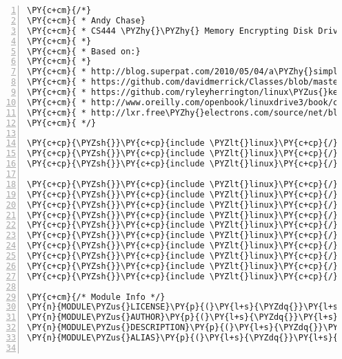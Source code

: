 \begin{Verbatim}[commandchars=\\\{\},numbers=left,firstnumber=1,stepnumber=1]
\PY{c+cm}{/*}
\PY{c+cm}{ * Andy Chase}
\PY{c+cm}{ * CS444 \PYZhy{}\PYZhy{} Memory Encrypting Disk Driver}
\PY{c+cm}{ *}
\PY{c+cm}{ * Based on:}
\PY{c+cm}{ *}
\PY{c+cm}{ * http://blog.superpat.com/2010/05/04/a\PYZhy{}simple\PYZhy{}block\PYZhy{}driver\PYZhy{}for\PYZhy{}linux\PYZhy{}kernel\PYZhy{}2\PYZhy{}6\PYZhy{}31/}
\PY{c+cm}{ * https://github.com/davidmerrick/Classes/blob/master/CS411/project3/osurd.c}
\PY{c+cm}{ * https://github.com/ryleyherrington/linux\PYZus{}kernel\PYZus{}411/blob/master/device\PYZus{}driver/device\PYZus{}driver.c}
\PY{c+cm}{ * http://www.oreilly.com/openbook/linuxdrive3/book/ch16.pdf}
\PY{c+cm}{ * http://lxr.free\PYZhy{}electrons.com/source/net/bluetooth/smp.c?v=3.14\PYZsh{}L54}
\PY{c+cm}{ */}

\PY{c+cp}{\PYZsh{}}\PY{c+cp}{include \PYZlt{}linux}\PY{c+cp}{/}\PY{c+cp}{module.h\PYZgt{}}
\PY{c+cp}{\PYZsh{}}\PY{c+cp}{include \PYZlt{}linux}\PY{c+cp}{/}\PY{c+cp}{moduleparam.h\PYZgt{}}
\PY{c+cp}{\PYZsh{}}\PY{c+cp}{include \PYZlt{}linux}\PY{c+cp}{/}\PY{c+cp}{init.h\PYZgt{}}

\PY{c+cp}{\PYZsh{}}\PY{c+cp}{include \PYZlt{}linux}\PY{c+cp}{/}\PY{c+cp}{kernel.h\PYZgt{}	}\PY{c+cm}{/* printk() */}
\PY{c+cp}{\PYZsh{}}\PY{c+cp}{include \PYZlt{}linux}\PY{c+cp}{/}\PY{c+cp}{fs.h\PYZgt{}		}\PY{c+cm}{/* everything... */}
\PY{c+cp}{\PYZsh{}}\PY{c+cp}{include \PYZlt{}linux}\PY{c+cp}{/}\PY{c+cp}{errno.h\PYZgt{}	}\PY{c+cm}{/* error codes */}
\PY{c+cp}{\PYZsh{}}\PY{c+cp}{include \PYZlt{}linux}\PY{c+cp}{/}\PY{c+cp}{types.h\PYZgt{}	}\PY{c+cm}{/* size\PYZus{}t */}
\PY{c+cp}{\PYZsh{}}\PY{c+cp}{include \PYZlt{}linux}\PY{c+cp}{/}\PY{c+cp}{vmalloc.h\PYZgt{}}
\PY{c+cp}{\PYZsh{}}\PY{c+cp}{include \PYZlt{}linux}\PY{c+cp}{/}\PY{c+cp}{genhd.h\PYZgt{}}
\PY{c+cp}{\PYZsh{}}\PY{c+cp}{include \PYZlt{}linux}\PY{c+cp}{/}\PY{c+cp}{blkdev.h\PYZgt{}}
\PY{c+cp}{\PYZsh{}}\PY{c+cp}{include \PYZlt{}linux}\PY{c+cp}{/}\PY{c+cp}{hdreg.h\PYZgt{}}
\PY{c+cp}{\PYZsh{}}\PY{c+cp}{include \PYZlt{}linux}\PY{c+cp}{/}\PY{c+cp}{crypto.h\PYZgt{}}
\PY{c+cp}{\PYZsh{}}\PY{c+cp}{include \PYZlt{}linux}\PY{c+cp}{/}\PY{c+cp}{scatterlist.h\PYZgt{}}

\PY{c+cm}{/* Module Info */}
\PY{n}{MODULE\PYZus{}LICENSE}\PY{p}{(}\PY{l+s}{\PYZdq{}}\PY{l+s}{GPL}\PY{l+s}{\PYZdq{}}\PY{p}{)}\PY{p}{;}
\PY{n}{MODULE\PYZus{}AUTHOR}\PY{p}{(}\PY{l+s}{\PYZdq{}}\PY{l+s}{Andrew Chase}\PY{l+s}{\PYZdq{}}\PY{p}{)}\PY{p}{;}
\PY{n}{MODULE\PYZus{}DESCRIPTION}\PY{p}{(}\PY{l+s}{\PYZdq{}}\PY{l+s}{Homework 3: Encrypted Block Device}\PY{l+s}{\PYZdq{}}\PY{p}{)}\PY{p}{;}
\PY{n}{MODULE\PYZus{}ALIAS}\PY{p}{(}\PY{l+s}{\PYZdq{}}\PY{l+s}{membdiskblk}\PY{l+s}{\PYZdq{}}\PY{p}{)}\PY{p}{;}


\end{Verbatim}
